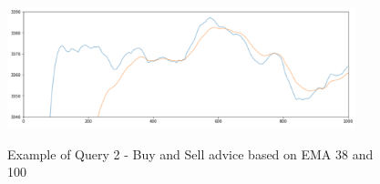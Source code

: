\begin{figure}[!ht]
    \begin{center}
        \includegraphics[width=0.9\textwidth]{./images/query2_example.png}
        \label{fig:EMAs}
        \caption{Example of Query 2 - Buy and Sell advice based on EMA 38 and 100 }
    \end{center}
\end{figure}
